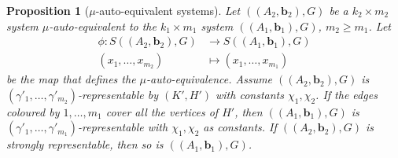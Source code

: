 \documentclass[10pt]{article}
\newtheorem{proposition}[theorem]{Proposition}
\begin{document}
\begin{proposition}[$\mu$-auto-equivalent systems] \label{p.mu-auto-equivalent}
Let $((A_2,\mathbf{b}_2),G)$ be a $k_2\times m_2$ system $\mu$-auto-equivalent to the $k_1\times m_1$ system $((A_1,\mathbf{b}_1),G)$, $m_2\geq m_1$. Let
\begin{align}
		\phi:S((A_2,\mathbf{b}_2),G)&\longrightarrow S((A_1,\mathbf{b}_1),G) \nonumber \\
	(x_1,\ldots,x_{m_2}) &\longmapsto  \left(x_{1},\ldots,x_{m_1}\right) \nonumber
\end{align}
be the map that defines the $\mu$-auto-equivalence.
Assume $((A_2,\mathbf{b}_2),G)$ is $(\gamma'_1,\ldots,\gamma'_{m_2})$-representable by $(K',H')$ 
with constants $\chi_1,\chi_2$. If 
	the edges coloured by $1,\ldots,m_1$ cover all the vertices of $H'$, 	 then  $((A_1,\mathbf{b}_1),G)$ is $(\gamma'_{1},\ldots,\gamma'_{m_1})$-representable 
	with $\chi_1,\chi_2$ as constants.
	If $((A_2,\mathbf{b}_2),G)$ is strongly representable, then so is $((A_1,\mathbf{b}_1),G)$.
\end{proposition}
\end{document}
